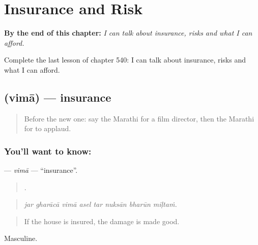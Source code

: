
\chapter{Insurance and Risk}
\label{ch:mr-insurance-and-risk}

\begin{chapteropening}
\textbf{By the end of this chapter:} \emph{I can talk about insurance, risks and what I can afford.}

Complete the last lesson of chapter 540: I can talk about insurance, risks and what I can afford.
\end{chapteropening}

\section[\texorpdfstring{\mr{विमा} (vimā)}{विमा (vimā)}]{ (vimā) — insurance}

\label{lesson:MR-C540-vima}



\begin{quote}
Before the new one: say the Marathi for a film director, then the Marathi for to applaud.
\end{quote}

\subsection*{You'll want to know: }
\textbf{} — \emph{vimā} — \textquotedblleft{}insurance\textquotedblright{}.

\begin{quote}
       .
\end{quote}

\begin{quote}
\emph{jar gharācā vimā asel tar nuksān bharūn miḷtaṁ.}
\end{quote}

\begin{quote}
If the house is insured, the damage is made good.
\end{quote}

Masculine.

